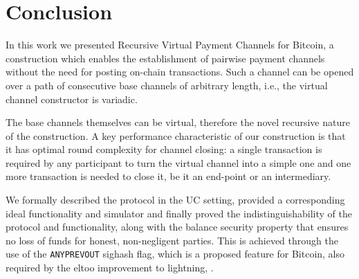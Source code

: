 \section{Conclusion}

  In this work we presented Recursive Virtual Payment Channels for Bitcoin,
  a construction which enables the establishment of pairwise payment channels without the need for
  posting on-chain transactions. Such a channel can be opened over a path of consecutive base
  channels of arbitrary length, i.e., the virtual channel constructor is variadic. 

  The base channels themselves
  can be virtual, therefore the novel recursive nature of the construction. 
  A key performance characteristic of our construction is that it has optimal
  round complexity for channel closing: a single transaction is required
  by any participant to turn the virtual channel into a simple one and one more
  transaction is needed to close it, be it an end-point or an intermediary. 
  
  We formally described the protocol in the UC setting, provided a corresponding
  ideal functionality and simulator and finally proved the indistinguishability
  of the protocol and functionality, along with the balance security property
  that ensures no loss of funds for honest, non-negligent parties. This is
  achieved through the use of the \texttt{ANYPREVOUT} sighash flag, which is a
  proposed feature for Bitcoin, also required by the eltoo improvement to lightning, 
  \cite{eltoo}. 

\newpage
